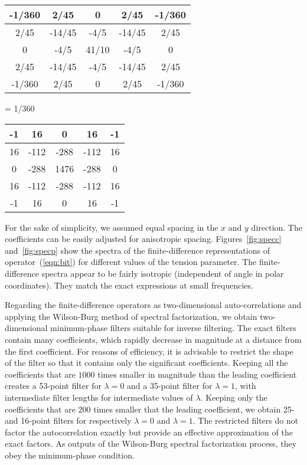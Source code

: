 \begin{center}
\begin{tabular}{|c|c|c|c|c|}
\hline 
-1/360 & 2/45 & 0 & 2/45 & -1/360 \\
\hline
2/45 & -14/45 & -4/5 & -14/45 & 2/45 \\
\hline
0 & -4/5 & 41/10 & -4/5 & 0 \\
\hline
2/45 & -14/45 & -4/5 & -14/45 & 2/45 \\
\hline
-1/360 & 2/45 & 0 & 2/45 & -1/360 \\
\hline
\end{tabular} =
1/360 
\begin{tabular}{|c|c|c|c|c|}
\hline 
-1 & 16 & 0 & 16 & -1 \\
\hline
16 & -112 & -288 & -112 & 16 \\
\hline
0 & -288 & 1476 & -288 & 0 \\
\hline
16 & -112 & -288 & -112 & 16 \\
\hline
-1 & 16 & 0 & 16 & -1 \\
\hline
\end{tabular}
\end{center}
For the sake of simplicity, we assumed equal spacing in the $x$ and $y$
direction. The coefficients can be easily adjusted for anisotropic
spacing. Figures~\ref{fig:specc} and~\ref{fig:specp} show the spectra
of the finite-difference representations of operator~(\ref{eqn:bit})
for different values of the tension parameter. The
finite-difference spectra appear to be fairly isotropic (independent of
angle in polar coordinates).  They match the exact expressions at small
frequencies.


\par
Regarding the finite-difference operators as two-dimensional
auto-correlations and applying the Wilson-Burg method of spectral
factorization, we obtain two-dimensional minimum-phase filters
suitable for inverse filtering.  The exact filters contain many
coefficients, which rapidly decrease in magnitude at a distance from
the first coefficient. For reasons of efficiency, it is advisable to
restrict the shape of the filter so that it contains only the
significant coefficients. Keeping all the coefficients that are $1000$
times smaller in magnitude than the leading coefficient creates a
53-point filter for $\lambda=0$ and a 35-point filter for $\lambda=1$,
with intermediate filter lengths for intermediate values of $\lambda$.
Keeping only the coefficients that are $200$ times smaller that the
leading coefficient, we obtain 25- and 16-point filters for
respectively $\lambda=0$ and $\lambda=1$.  The restricted filters do
not factor the autocorrelation exactly but provide an effective
approximation of the exact factors. As outputs of the Wilson-Burg
spectral factorization process, they obey the minimum-phase condition.


